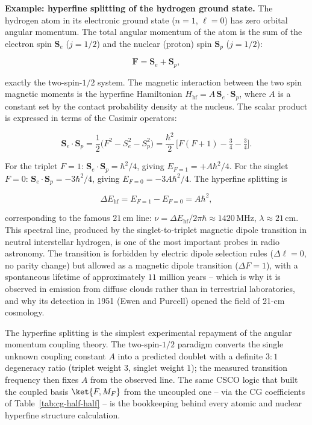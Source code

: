 \medskip\noindent\textbf{Example: hyperfine splitting of the hydrogen ground state.}
The hydrogen atom in its electronic ground state ($n=1$, $\ell=0$) has zero orbital angular momentum. The total angular momentum of the atom is the sum of the electron spin $\bm S_e$ ($j=1/2$) and the nuclear (proton) spin $\bm S_p$ ($j=1/2$):
\begin{linenomath}
  \begin{equation}
    \bm F = \bm S_e + \bm S_p,
  \end{equation}
\end{linenomath}
exactly the two-spin-$1/2$ system. The magnetic interaction between the two spin magnetic moments is the hyperfine Hamiltonian $H_{\text{hf}} = A\,\bm S_e\cdot\bm S_p$, where $A$ is a constant set by the contact probability density at the nucleus. The scalar product is expressed in terms of the Casimir operators:
\begin{linenomath}
  \begin{equation}
    \bm S_e\cdot\bm S_p
    = \frac12\bigl(F^2 - S_e^2 - S_p^2\bigr)
    = \frac{\hbar^2}{2}\,
      \bigl[F(F+1) - \tfrac34 - \tfrac34\bigr].
  \end{equation}
\end{linenomath}
For the triplet $F = 1$: $\bm S_e\cdot\bm S_p = \hbar^2/4$, giving $E_{F=1} = +A\hbar^2/4$. For the singlet $F = 0$: $\bm S_e\cdot\bm S_p = -3\hbar^2/4$, giving $E_{F=0} = -3A\hbar^2/4$. The hyperfine splitting is
\begin{linenomath}
  \begin{equation}
    \Delta E_{\text{hf}} = E_{F=1} - E_{F=0} = A\hbar^2,
  \end{equation}
\end{linenomath}
corresponding to the famous $21\,\text{cm}$ line: $\nu = \Delta E_{\text{hf}}/2\pi\hbar \approx 1420\,\text{MHz}$, $\lambda \approx 21\,\text{cm}$. This spectral line, produced by the singlet-to-triplet magnetic dipole transition in neutral interstellar hydrogen, is one of the most important probes in radio astronomy. The transition is forbidden by electric dipole selection rules ($\Delta\ell = 0$, no parity change) but allowed as a magnetic dipole transition ($\Delta F = 1$), with a spontaneous lifetime of approximately $11$ million years -- which is why it is observed in emission from diffuse clouds rather than in terrestrial laboratories, and why its detection in 1951 (Ewen and Purcell) opened the field of 21-cm cosmology.

The hyperfine splitting is the simplest experimental repayment of the angular momentum coupling theory. The two-spin-$1/2$ paradigm converts the single unknown coupling constant $A$ into a predicted doublet with a definite $3:1$ degeneracy ratio (triplet weight $3$, singlet weight $1$); the measured transition frequency then fixes $A$ from the observed line. The same CSCO logic that built the coupled basis $\ket{F,M_F}$ from the uncoupled one -- via the CG coefficients of Table~\ref{tab:cg-half-half} -- is the bookkeeping behind every atomic and nuclear hyperfine structure calculation.

